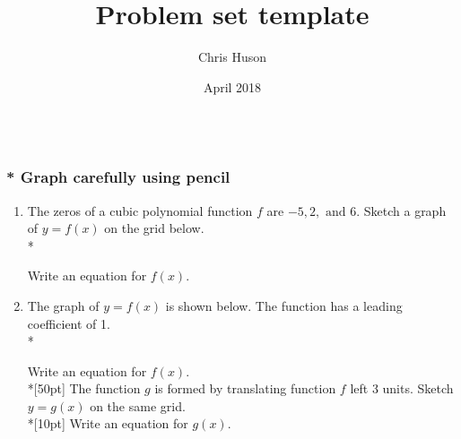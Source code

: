 \documentclass[12pt, oneside]{article}
\title{Problem set template}
\author{Chris Huson}
\date{April 2018}
\begin{document}

\subsubsection*{\\* \textnormal{Graph carefully using pencil}}

\begin{enumerate}
\subsubsection*{Practice problems}

\item The zeros of a cubic polynomial function $f$ are  $-5, 2, \text{ and } 6$. Sketch a graph of $y = f(x)$ on the grid below.\\*
\begin{center}
\end{center}
Write an equation for $f(x)$.

\newpage

\item The graph of $y = f(x)$ is shown below. The function has a leading coefficient of 1.\\*
\begin{center}
\end{center}
Write an equation for $f(x)$.\\*[50pt]
The function $g$ is formed by translating function $f$ left 3 units. Sketch $y=g(x)$ on the same grid.\\*[10pt]
Write an equation for $g(x)$.


\end{enumerate}
\end{document}
